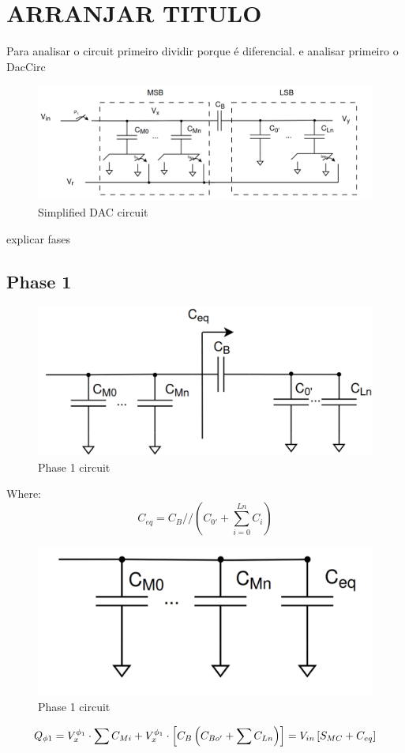 \section{ARRANJAR TITULO}

Para analisar o circuit primeiro dividir porque é diferencial. e analisar primeiro o DacCirc

\begin{figure}[H]
    \centering
    \includegraphics*[scale = 0.35]{Images/DacCirc.png}
    \caption{Simplified DAC circuit}
    \label{fig:DAC_Circ}
\end{figure}

explicar fases

\subsection{Phase 1}

\begin{figure}[H]
    \centering
    \includegraphics*[scale = 0.35]{Images/DACCircP1.png}
    \caption{Phase 1 circuit}
    \label{fig:P1_Circ}
\end{figure}

Where:
\begin{equation}
    C_{eq} = C_B // \left( C_{0'}+\sum_{i=0}^{Ln} C_i\right )
\end{equation}
\begin{figure}[H]
    \centering
    \includegraphics*[scale = 0.35]{Images/DACP1Ceq.png}
    \caption{Phase 1 circuit}
    \label{fig:P1_DACCeq}
\end{figure}

\begin{equation}
    Q_{\phi 1} = V_x^{\phi_1}\cdot \sum C_{Mi} + V_x^{\phi_1}\cdot \left [  C_B \\ \left ( C_{Bo'} + \sum C_{Ln} \right) \right ] = V_{in}\left[ S_{MC} + C_{eq} \right]
\end{equation}

